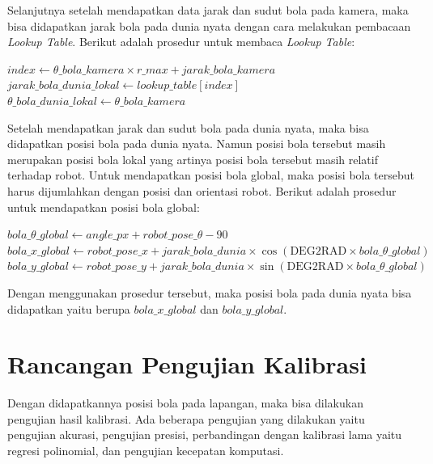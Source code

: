 Selanjutnya setelah mendapatkan data jarak dan sudut bola pada kamera, maka bisa 
didapatkan jarak bola pada dunia nyata dengan cara melakukan pembacaan \emph{Lookup Table}. Berikut adalah prosedur untuk membaca \emph{Lookup Table}: 

\begin{algorithm}[H]
  \caption{Proses membaca \emph{Lookup Table}}\label{alg:prosedur5}
  \begin{algorithmic}[1]
      \State $index \gets \theta\_bola\_kamera \times r\_max + jarak\_bola\_kamera$
      \State $jarak\_bola\_dunia\_lokal \gets lookup\_table[index]$
      \State $\theta\_bola\_dunia\_lokal \gets \theta\_bola\_kamera$
  \EndProcedure
  \end{algorithmic}
\end{algorithm}

Setelah mendapatkan jarak dan sudut bola pada dunia nyata, maka bisa didapatkan posisi bola pada dunia nyata. Namun posisi bola tersebut masih merupakan posisi bola lokal yang artinya posisi bola tersebut masih relatif terhadap robot. Untuk mendapatkan posisi bola global, maka posisi bola tersebut harus dijumlahkan dengan posisi dan orientasi robot. Berikut adalah prosedur untuk mendapatkan posisi bola global: 

\begin{algorithm}[H]
  \caption{Proses mendapatkan posisi bola global}\label{alg:prosedur6}
  \begin{algorithmic}[1]
      \State $bola\_\theta\_global \gets angle\_px + robot\_pose\_\theta - 90$
      \State $bola\_x\_global \gets robot\_pose\_x + jarak\_bola\_dunia \times \cos(\text{DEG2RAD} \times bola\_\theta\_global)$
      \State $bola\_y\_global \gets robot\_pose\_y + jarak\_bola\_dunia \times \sin(\text{DEG2RAD} \times bola\_\theta\_global)$
  \EndProcedure
  \end{algorithmic}
\end{algorithm}

Dengan menggunakan prosedur tersebut, maka posisi bola pada dunia nyata bisa didapatkan yaitu berupa $bola\_x\_global$ dan $bola\_y\_global$. 

\section{Rancangan Pengujian Kalibrasi}
\label{sec:rancanganpengujian}

Dengan didapatkannya posisi bola pada lapangan, maka bisa dilakukan pengujian hasil kalibrasi. Ada beberapa pengujian yang dilakukan yaitu pengujian akurasi, pengujian presisi, perbandingan dengan kalibrasi lama yaitu regresi polinomial, dan pengujian kecepatan komputasi. 

